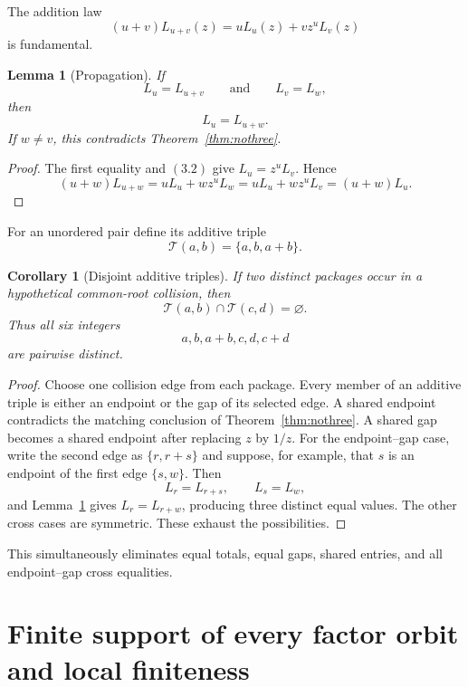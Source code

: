\documentclass[11pt]{article}
\newtheorem{lemma}[theorem]{Lemma}
\newtheorem{corollary}[theorem]{Corollary}
\theoremstyle{definition}
\newcommand{\T}{\mathcal T}
\begin{document}
The addition law
\begin{equation}
 (u+v)L_{u+v}(z)=uL_u(z)+vz^uL_v(z)
 \tag{3.2}
\end{equation}
is fundamental.

\begin{lemma}[Propagation]\label{lem:propagation}
If
\[
 L_u=L_{u+v}
 \qquad\text{and}\qquad
 L_v=L_w,
\]
then
\[
 L_u=L_{u+w}.
\]
If \(w\neq v\), this contradicts Theorem~\ref{thm:nothree}.
\end{lemma}

\begin{proof}
The first equality and \((3.2)\) give \(L_u=z^uL_v\).  Hence
\[
 (u+w)L_{u+w}=uL_u+wz^uL_w
 =uL_u+wz^uL_v=(u+w)L_u.
\]
\end{proof}

For an unordered pair define its additive triple
\[
 \T(a,b)=\{a,b,a+b\}.
\]

\begin{corollary}[Disjoint additive triples]\label{cor:triples}
If two distinct packages occur in a hypothetical common-root collision, then
\begin{equation}
 \T(a,b)\cap\T(c,d)=\varnothing.
 \tag{3.3}
\end{equation}
Thus all six integers
\[
 a,b,a+b,c,d,c+d
\]
are pairwise distinct.
\end{corollary}

\begin{proof}
Choose one collision edge from each package.  Every member of an additive
triple is either an endpoint or the gap of its selected edge.  A shared
endpoint contradicts the matching conclusion of Theorem~\ref{thm:nothree}.
A shared gap becomes a shared endpoint after replacing \(z\) by \(1/z\).
For the endpoint--gap case, write the second edge as
\(\{r,r+s\}\) and suppose, for example, that \(s\) is an endpoint of
the first edge \(\{s,w\}\).  Then
\[
 L_r=L_{r+s},\qquad L_s=L_w,
\]
and Lemma~\ref{lem:propagation} gives \(L_r=L_{r+w}\), producing three
distinct equal values.  The other cross cases are symmetric.  These exhaust
the possibilities.
\end{proof}

This simultaneously eliminates equal totals, equal gaps, shared entries, and
all endpoint--gap cross equalities.

\section{Finite support of every factor orbit and local finiteness}
\label{sec:finite-support}
\end{document}

